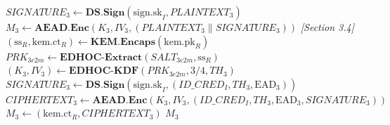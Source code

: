 \documentclass{easychair}
\begin{document}
\begin{algorithm}[H]
\begin{algorithmic}[1]
\State $SIGNATURE_3 \gets \mathbf{DS.Sign}(\mathrm{sign.sk}_I, PLAINTEXT_3)$
\State $M_3 \gets \mathbf{AEAD.Enc}(K_3, IV_3, (PLAINTEXT_3 \parallel SIGNATURE_3))$
\Statex \textit{[Section 3.4]} 
\State $(\mathrm{ss}_R, \mathrm{kem.ct}_R) \gets \mathbf{KEM.Encaps}(\mathrm{kem.pk}_R)$
\State $PRK_{3e2m} \gets \mathbf{EDHOC\text{-}Extract}(SALT_{3e2m}, \mathrm{ss}_R)$
\State $(K_3, IV_3) \gets \mathbf{EDHOC\text{-}KDF}(PRK_{3e2m}, 3\text{/}4, TH_3)$
\State $SIGNATURE_3 \gets \mathbf{DS.Sign}(\mathrm{sign.sk}_I, (ID\_CRED_I, TH_3, \mathrm{EAD}_3))$
\State $CIPHERTEXT_3 \gets \mathbf{AEAD.Enc}(K_3, IV_3, (ID\_CRED_I, TH_3, \mathrm{EAD}_3, SIGNATURE_3))$
\State $M_3 \gets (\mathrm{kem.ct}_R, CIPHERTEXT_3)$
\State \Return $M_3$
\end{algorithmic}
\end{algorithm}
\end{document}

